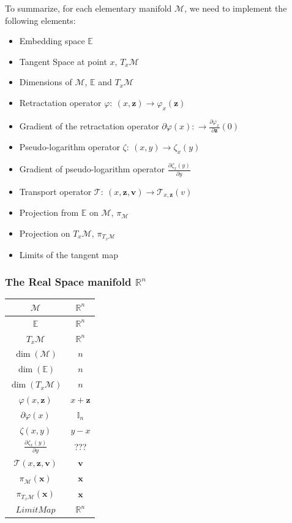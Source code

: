 To summarize, for each elementary manifold $\mathcal{M}$, we need to implement the following elements:
\begin{itemize}
  \item Embedding space $\mathbb{E}$
  \item Tangent Space at point $x$, $T_x\mathcal{M}$
  \item Dimensions of $\mathcal{M}$, $\mathbb{E}$ and $T_x\mathcal{M}$
  \item Retractation operator $\varphi:\ (x,\mathbf{z}) \rightarrow \varphi_x(\mathbf{z})$
  \item Gradient of the retractation operator $\partial \varphi(x):\rightarrow \frac{\partial \varphi_x}{\partial \mathbf{z}}(0)$
  \item Pseudo-logarithm operator $\zeta:\ (x,y) \rightarrow \zeta_x(y)$
  \item Gradient of pseudo-logarithm operator $\frac{\partial \zeta_x(y)}{\partial y}$
  \item Transport operator $\mathcal{T}:\ (x,\mathbf{z}, \mathbf{v})\rightarrow \mathcal{T}_{x,\mathbf{z}}(v)$
  \item Projection from $\mathbb{E}$ on $\mathcal{M}$, $\pi_\mathcal{M}$
  \item Projection on $T_x\mathcal{M}$, $\pi_{T_x\mathcal{M}}$
  \item Limits of the tangent map
\end{itemize}

\subsubsection{The Real Space manifold $\mathbb{R}^n$}
\label{ssub:the_real_space}

\begin{table} [H]
\centering
\begin{tabular}{cc}
  \toprule
  $\mathcal{M}$ & $\mathbb{R}^n$ \\
  \midrule
  $\mathbb{E}$ & $\mathbb{R}^n$ \\
  \midrule
  $T_x\mathcal{M}$ & $\mathbb{R}^n$ \\
  \midrule
  $\dim(\mathcal{M})$ & $n$ \\
  \midrule
  $\dim(\mathbb{E})$ & $n$ \\
  \midrule
  $\dim(T_x\mathcal{M})$ & $n$ \\
  \midrule
  $\varphi(x,\mathbf{z})$ & $x + \mathbf{z}$ \\
  \midrule
  $\partial \varphi(x)$ & $\mathbb{I}_n$ \\
  \midrule
  $\zeta(x,y)$ & $y - x$ \\
  \midrule
  $\frac{\partial \zeta_x(y)}{\partial y}$ & ??? \\
  \midrule
  $\mathcal{T}(x,\mathbf{z}, \mathbf{v})$ & $\mathbf{v}$ \\
  \midrule
  $\pi_\mathcal{M}(\mathbf{x})$ & $\mathbf{x}$ \\
  \midrule
  $\pi_{T_x\mathcal{M}}(\mathbf{x})$ & $\mathbf{x}$ \\
  \midrule
  $Limit Map$ & $\mathbb{R}^n$ \\
  \bottomrule
\end{tabular}
\end{table}

